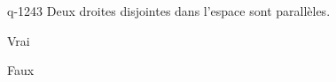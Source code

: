 \begin{truefalse}{q-1243}
Deux droites disjointes dans l'espace sont parallèles.
\item Vrai
\item* Faux
\end{truefalse}

